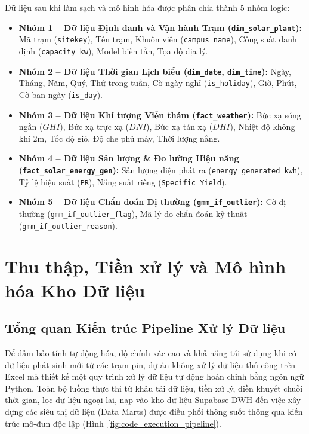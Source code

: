 \documentclass[12pt, a4paper]{report}
\begin{document}
Dữ liệu sau khi làm sạch và mô hình hóa được phân chia thành 5 nhóm logic:
\begin{itemize}[noitemsep]
    \item \textbf{Nhóm 1 -- Dữ liệu Định danh và Vận hành Trạm (\texttt{dim\_solar\_plant}):} Mã trạm (\texttt{sitekey}), Tên trạm, Khuôn viên (\texttt{campus\_name}), Công suất danh định (\texttt{capacity\_kw}), Model biến tần, Tọa độ địa lý.
    \item \textbf{Nhóm 2 -- Dữ liệu Thời gian Lịch biểu (\texttt{dim\_date}, \texttt{dim\_time}):} Ngày, Tháng, Năm, Quý, Thứ trong tuần, Cờ ngày nghỉ (\texttt{is\_holiday}), Giờ, Phút, Cờ ban ngày (\texttt{is\_day}).
    \item \textbf{Nhóm 3 -- Dữ liệu Khí tượng Viễn thám (\texttt{fact\_weather}):} Bức xạ sóng ngắn ($GHI$), Bức xạ trực xạ ($DNI$), Bức xạ tán xạ ($DHI$), Nhiệt độ không khí 2m, Tốc độ gió, Độ che phủ mây, Thời lượng nắng.
    \item \textbf{Nhóm 4 -- Dữ liệu Sản lượng \& Đo lường Hiệu năng (\texttt{fact\_solar\_energy\_gen}):} Sản lượng điện phát ra (\texttt{energy\_generated\_kwh}), Tỷ lệ hiệu suất (\texttt{PR}), Năng suất riêng (\texttt{Specific\_Yield}).
    \item \textbf{Nhóm 5 -- Dữ liệu Chẩn đoán Dị thường (\texttt{gmm\_if\_outlier}):} Cờ dị thường (\texttt{gmm\_if\_outlier\_flag}), Mã lý do chẩn đoán kỹ thuật (\texttt{gmm\_if\_outlier\_reason}).
\end{itemize}

\newpage
\chapter{Thu thập, Tiền xử lý và Mô hình hóa Kho Dữ liệu}
\label{chap:etl_modeling}

\section{Tổng quan Kiến trúc Pipeline Xử lý Dữ liệu}
\label{sec:pipeline_overview}

Để đảm bảo tính tự động hóa, độ chính xác cao và khả năng tái sử dụng khi có dữ liệu phát sinh mới từ các trạm pin, dự án không xử lý dữ liệu thủ công trên Excel mà thiết kế một quy trình xử lý dữ liệu tự động hoàn chỉnh bằng ngôn ngữ Python. Toàn bộ luồng thực thi từ khâu tải dữ liệu, tiền xử lý, điền khuyết chuỗi thời gian, lọc dữ liệu ngoại lai, nạp vào kho dữ liệu Supabase DWH đến việc xây dựng các siêu thị dữ liệu (Data Marts) được điều phối thông suốt thông qua kiến trúc mô-đun độc lập (Hình~\ref{fig:code_execution_pipeline}).
\end{document}
